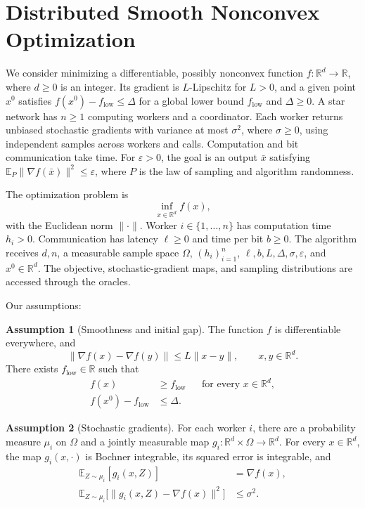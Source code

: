 \documentclass[10pt]{article}
\theoremstyle{definition}
\newtheorem{assumption}{Assumption}
\begin{document}
\section*{Distributed Smooth Nonconvex Optimization}
We consider minimizing a differentiable, possibly nonconvex function $f:\mathbb{R}^d\to\mathbb{R}$, where $d\geq0$ is an integer. Its gradient is $L$-Lipschitz for $L>0$, and a given point $x^0$ satisfies $f(x^0)-f_{\mathrm{low}}\leq\Delta$ for a global lower bound $f_{\mathrm{low}}$ and $\Delta\geq0$. A star network has $n\geq1$ computing workers and a coordinator. Each worker returns unbiased stochastic gradients with variance at most $\sigma^2$, where $\sigma\geq0$, using independent samples across workers and calls. Computation and bit communication take time. For $\varepsilon>0$, the goal is an output $\bar{x}$ satisfying $\mathbb{E}_{P}\|\nabla f(\bar{x})\|^2\leq\varepsilon$, where $P$ is the law of sampling and algorithm randomness.

The optimization problem is
\[
\inf_{x\in\mathbb{R}^d} f(x),
\]
with the Euclidean norm $\|\cdot\|$. Worker $i\in\{1,\ldots,n\}$ has computation time $h_i>0$. Communication has latency $\ell\geq0$ and time per bit $b\geq0$. The algorithm receives $d,n$, a measurable sample space $\Omega$, $(h_i)_{i=1}^n$, $\ell,b,L,\Delta,\sigma,\varepsilon$, and $x^0\in\mathbb{R}^d$. The objective, stochastic-gradient maps, and sampling distributions are accessed through the oracles.

Our assumptions:
\begin{assumption}[Smoothness and initial gap]
The function $f$ is differentiable everywhere, and
\[
\|\nabla f(x)-\nabla f(y)\|\leq L\|x-y\|,
\qquad x,y\in\mathbb{R}^d.
\]
There exists $f_{\mathrm{low}}\in\mathbb{R}$ such that
\[
\begin{aligned}
f(x)&\geq f_{\mathrm{low}} &&\text{for every }x\in\mathbb{R}^d,\\
f(x^0)-f_{\mathrm{low}}&\leq\Delta.
\end{aligned}
\]
\end{assumption}

\begin{assumption}[Stochastic gradients]
For each worker $i$, there are a probability measure $\mu_i$ on $\Omega$ and a jointly measurable map $g_i:\mathbb{R}^d\times\Omega\to\mathbb{R}^d$. For every $x\in\mathbb{R}^d$, the map $g_i(x,\cdot)$ is Bochner integrable, its squared error is integrable, and
\[
\begin{aligned}
\mathbb{E}_{Z\sim\mu_i}[g_i(x,Z)]&=\nabla f(x),\\
\mathbb{E}_{Z\sim\mu_i}\bigl[\|g_i(x,Z)-\nabla f(x)\|^2\bigr]&\leq\sigma^2.
\end{aligned}
\]
\end{assumption}
\end{document}
